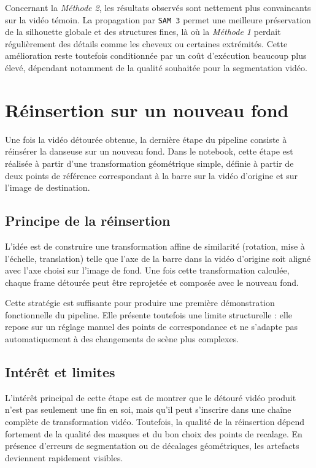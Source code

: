 \documentclass[11pt,a4paper]{article}
\begin{document}
Concernant la \textit{Méthode 2}, les résultats observés sont nettement plus convaincants sur la vidéo témoin.
La propagation par \texttt{SAM 3} permet une meilleure préservation de la silhouette globale et des structures fines, là où la \textit{Méthode 1} perdait régulièrement des détails comme les cheveux ou certaines extrémités.
Cette amélioration reste toutefois conditionnée par un coût d'exécution beaucoup plus élevé, dépendant notamment de la qualité souhaitée pour la segmentation vidéo.

\newpage

\section{Réinsertion sur un nouveau fond}
Une fois la vidéo détourée obtenue, la dernière étape du pipeline consiste à réinsérer la danseuse sur un nouveau fond.
Dans le notebook, cette étape est réalisée à partir d'une transformation géométrique simple, définie à partir de deux points de référence correspondant à la barre sur la vidéo d'origine et sur l'image de destination.

\subsection{Principe de la réinsertion}
L'idée est de construire une transformation affine de similarité (rotation, mise à l'échelle, translation) telle que l'axe de la barre dans la vidéo d'origine soit aligné avec l'axe choisi sur l'image de fond.
Une fois cette transformation calculée, chaque frame détourée peut être reprojetée et composée avec le nouveau fond.

Cette stratégie est suffisante pour produire une première démonstration fonctionnelle du pipeline.
Elle présente toutefois une limite structurelle : elle repose sur un réglage manuel des points de correspondance et ne s'adapte pas automatiquement à des changements de scène plus complexes.

\subsection{Intérêt et limites}
L'intérêt principal de cette étape est de montrer que le détouré vidéo produit n'est pas seulement une fin en soi, mais qu'il peut s'inscrire dans une chaîne complète de transformation vidéo.
Toutefois, la qualité de la réinsertion dépend fortement de la qualité des masques et du bon choix des points de recalage.
En présence d'erreurs de segmentation ou de décalages géométriques, les artefacts deviennent rapidement visibles.
\end{document}
